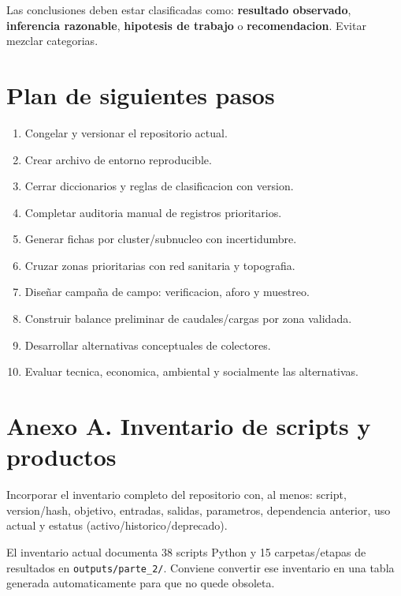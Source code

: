 \documentclass[11pt,letterpaper]{article}
\newcommand{\ruta}[1]{\texttt{#1}}
\begin{document}
\begin{evidencia}
Las conclusiones deben estar clasificadas como: \textbf{resultado observado}, \textbf{inferencia razonable}, \textbf{hipotesis de trabajo} o \textbf{recomendacion}. Evitar mezclar categorias.
\end{evidencia}

\section{Plan de siguientes pasos}

\begin{enumerate}
    \item Congelar y versionar el repositorio actual.
    \item Crear archivo de entorno reproducible.
    \item Cerrar diccionarios y reglas de clasificacion con version.
    \item Completar auditoria manual de registros prioritarios.
    \item Generar fichas por cluster/subnucleo con incertidumbre.
    \item Cruzar zonas prioritarias con red sanitaria y topografia.
    \item Diseñar campaña de campo: verificacion, aforo y muestreo.
    \item Construir balance preliminar de caudales/cargas por zona validada.
    \item Desarrollar alternativas conceptuales de colectores.
    \item Evaluar tecnica, economica, ambiental y socialmente las alternativas.
\end{enumerate}

\appendix
\section{Anexo A. Inventario de scripts y productos}

Incorporar el inventario completo del repositorio con, al menos: script, version/hash, objetivo, entradas, salidas, parametros, dependencia anterior, uso actual y estatus (activo/historico/deprecado).

\begin{evidencia}
El inventario actual documenta 38 scripts Python y 15 carpetas/etapas de resultados en \ruta{outputs/parte\_2/}. Conviene convertir ese inventario en una tabla generada automaticamente para que no quede obsoleta.
\end{evidencia}
\end{document}
